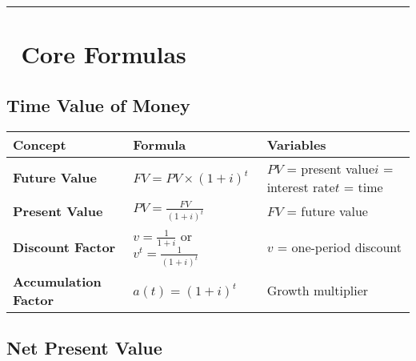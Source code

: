 \documentclass[
  letterpaper,
]{scrbook}
\begin{document}
\begin{center}\rule{0.5\linewidth}{0.5pt}\end{center}

\section*{🔢 Core Formulas}\label{core-formulas}


\subsection*{Time Value of Money}\label{time-value-of-money}

\begin{longtable}[]{@{}
  >{\raggedright\arraybackslash}p{}
  >{\raggedright\arraybackslash}p{}
  >{\raggedright\arraybackslash}p{}@{}}
\toprule\noalign{}
\begin{minipage}[b]{\linewidth}\raggedright
Concept
\end{minipage} & \begin{minipage}[b]{\linewidth}\raggedright
Formula
\end{minipage} & \begin{minipage}[b]{\linewidth}\raggedright
Variables
\end{minipage} \\
\midrule\noalign{}
\endhead
\bottomrule\noalign{}
\endlastfoot
\textbf{Future Value} & \(FV = PV \times (1+i)^t\) & \(PV\) = present
value\(i\) = interest rate\(t\) = time \\
\textbf{Present Value} & \(PV = \frac{FV}{(1+i)^t}\) & \(FV\) = future
value \\
\textbf{Discount Factor} & \(v = \frac{1}{1+i}\) or
\(v^t = \frac{1}{(1+i)^t}\) & \(v\) = one-period discount \\
\textbf{Accumulation Factor} & \(a(t) = (1+i)^t\) & Growth multiplier \\
\end{longtable}

\subsection*{Net Present Value}\label{net-present-value}
\end{document}
